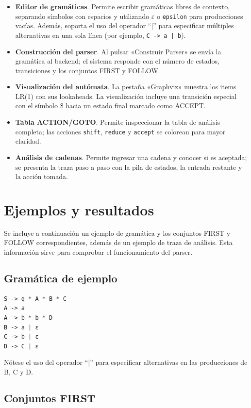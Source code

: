 \documentclass[12pt,a4paper]{article}
\begin{document}
\begin{itemize}
  \item \textbf{Editor de gramáticas}.  Permite escribir gramáticas libres de contexto, separando símbolos con espacios y utilizando $\varepsilon$ o \texttt{epsilon} para producciones vacías.  Además, soporta el uso del operador ``|'' para especificar múltiples alternativas en una sola línea (por ejemplo, \texttt{C -> a | b}).
  \item \textbf{Construcción del parser}.  Al pulsar «Construir Parser» se envía la gramática al backend; el sistema responde con el número de estados, transiciones y los conjuntos FIRST y FOLLOW.
  \item \textbf{Visualización del autómata}.  La pestaña «Graphviz» muestra los items LR(1) con sus lookaheads.  La visualización incluye una transición especial con el símbolo \$ hacia un estado final marcado como ACCEPT.
  \item \textbf{Tabla ACTION/GOTO}.  Permite inspeccionar la tabla de análisis completa; las acciones \texttt{shift}, \texttt{reduce} y \texttt{accept} se colorean para mayor claridad.
  \item \textbf{Análisis de cadenas}.  Permite ingresar una cadena y conocer si es aceptada; se presenta la traza paso a paso con la pila de estados, la entrada restante y la acción tomada.
\end{itemize}

\section{Ejemplos y resultados}

Se incluye a continuación un ejemplo de gramática y los conjuntos FIRST y FOLLOW correspondientes, además de un ejemplo de traza de análisis.  Esta información sirve para comprobar el funcionamiento del parser.

\subsection{Gramática de ejemplo}

\begin{verbatim}
S -> q * A * B * C
A -> a
A -> b * b * D
B -> a | ε
C -> b | ε
D -> C | ε
\end{verbatim}

Nótese el uso del operador ``|'' para especificar alternativas en las producciones de B, C y D.

\subsection{Conjuntos FIRST}
\end{document}
